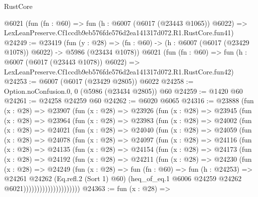 \begin{lexlean}{RustCore}
\begin{coremodule}
    @6021
    (fun (fn : @60) =>
    fun (h : @6007 (@6017 (@23443 @1065)) @6022) =>
    LexLeanPreserve.Cf1ccdb9eb576fde576d2ea141317d072.R1.RustCore.fun41)
@24249 := @23419
    (fun (y : @28) =>
    (fn : @60) -> (h : @6007 (@6017 (@23429 @1078)) @6022) -> @5986 (@23434 @1078))
    @6021
    (fun (fn : @60) =>
    fun (h : @6007 (@6017 (@23443 @1078)) @6022) =>
    LexLeanPreserve.Cf1ccdb9eb576fde576d2ea141317d072.R1.RustCore.fun42)
@24253 := @6007 (@6017 (@23429 @2805)) @6022
@24258 := Option.noConfusion.{0, 0} (@5986 (@23434 @2805)) @60
@24259 := @1420 @60
@24261 := @24258 @24259 @60
@24262 := @6020 @6065
@24316 := @23888
    (fun (x : @28) =>
    @23907
      (fun (x : @28) =>
      @23926
        (fun (x : @28) =>
        @23945
          (fun (x : @28) =>
          @23964
            (fun (x : @28) =>
            @23983
              (fun (x : @28) =>
              @24002
                (fun (x : @28) =>
                @24021
                  (fun (x : @28) =>
                  @24040
                    (fun (x : @28) =>
                    @24059
                      (fun (x : @28) =>
                      @24078
                        (fun (x : @28) =>
                        @24097
                          (fun (x : @28) =>
                          @24116
                            (fun (x : @28) =>
                            @24135
                              (fun (x : @28) =>
                              @24154
                                (fun (x : @28) =>
                                @24173
                                  (fun (x : @28) =>
                                  @24192
                                    (fun (x : @28) =>
                                    @24211
                                      (fun (x : @28) =>
                                      @24230
                                        (fun (x : @28) =>
                                        @24249
                                          (fun (x : @28) =>
                                          fun (fn : @60) =>
                                          fun (h : @24253) =>
                                          @24261
                                            @24262
                                            (Eq.refl.{2} (Sort 1) @60)
                                            (heq_of_eq.{1}
                                              @6006
                                              @24259
                                              @24262
                                              @6021)))))))))))))))))))))
@24363 := fun (x : @28) =>

\end{coremodule}
\end{lexlean}
